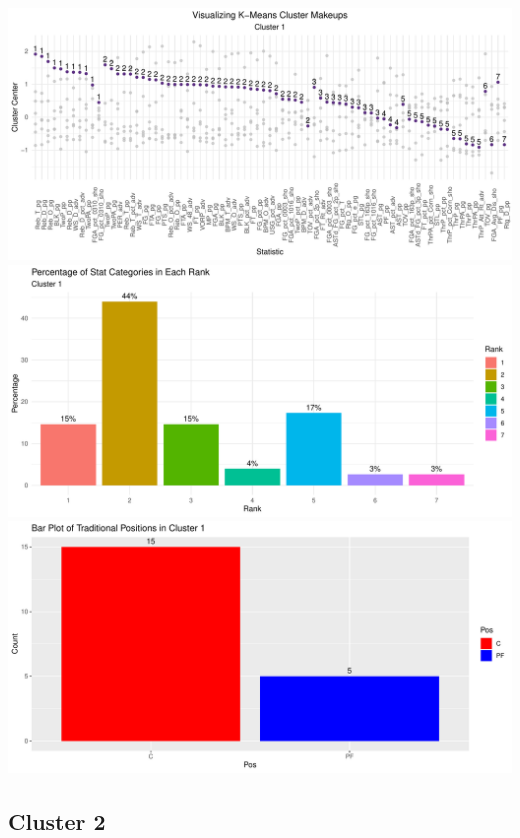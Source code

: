 \documentclass[
]{article}
\begin{document}
\includegraphics{Reclassifying-NBA-Player-Postions-Pt.-3---Clustering-Analysis-Results_files/figure-latex/unnamed-chunk-2-1.pdf}
\includegraphics{Reclassifying-NBA-Player-Postions-Pt.-3---Clustering-Analysis-Results_files/figure-latex/unnamed-chunk-2-2.pdf}
\includegraphics{Reclassifying-NBA-Player-Postions-Pt.-3---Clustering-Analysis-Results_files/figure-latex/unnamed-chunk-2-3.pdf}

\hypertarget{cluster-2}{%
\subsection{Cluster 2}\label{cluster-2}}
\end{document}
